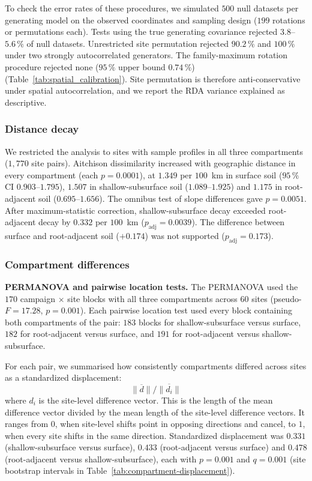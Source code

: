 \documentclass[11pt]{article}
\begin{document}
To check the error rates of these procedures, we simulated $500$ null datasets
per generating model on the observed coordinates and sampling design ($199$
rotations or permutations each). Tests using the true generating covariance
rejected $3.8$--$5.6\,\%$ of null datasets. Unrestricted site permutation
rejected $90.2\,\%$ and $100\,\%$ under two strongly autocorrelated generators.
The family-maximum rotation procedure rejected none ($95\,\%$ upper bound
$0.74\,\%$) (Table~\ref{tab:spatial_calibration}). Site permutation is
therefore anti-conservative under spatial autocorrelation, and we report the
RDA variance explained as descriptive.


\subsubsection{Distance decay}\label{sup:beta_decay}
We restricted the analysis to sites with sample profiles in all three compartments ($1{,}770$ site pairs). Aitchison dissimilarity increased with geographic distance in every compartment (each $p=0.0001$), at $1.349$ per $100$~km in surface soil ($95\,\%$ CI $0.903$--$1.795$), $1.507$ in shallow-subsurface soil ($1.089$--$1.925$) and $1.175$ in root-adjacent soil ($0.695$--$1.656$). The omnibus test of slope differences gave $p=0.0051$. After maximum-statistic correction, shallow-subsurface decay exceeded root-adjacent decay by $0.332$ per $100$~km ($p_{\mathrm{adj}}=0.0039$). The difference between surface and root-adjacent soil ($+0.174$) was not supported ($p_{\mathrm{adj}}=0.173$).


\subsubsection{Compartment differences}\label{sup:beta_compartment}

\textbf{PERMANOVA and pairwise location tests.} The PERMANOVA used the $170$ campaign $\times$ site blocks with all three compartments across $60$ sites (pseudo-$F=17.28$, $p=0.001$). Each pairwise location test used every block containing both compartments of the pair: $183$ blocks for shallow-subsurface versus surface, $182$ for root-adjacent versus surface, and $191$ for root-adjacent versus shallow-subsurface.

For each pair, we summarised how consistently compartments differed across sites as a standardized displacement:
\begin{equation*}
    \lVert\overline{d}\rVert /
\overline{\lVert d_i\rVert}
\end{equation*}
where $d_i$ is the site-level difference vector. This is the length of the mean difference vector divided by the mean length of the site-level difference vectors. It ranges from $0$, when site-level shifts point in opposing directions and cancel, to $1$, when every site shifts in the same direction. Standardized displacement was $0.331$ (shallow-subsurface versus surface), $0.433$ (root-adjacent versus surface) and $0.478$ (root-adjacent versus shallow-subsurface), each with $p=0.001$ and $q=0.001$ (site bootstrap intervals in Table~\ref{tab:compartment-displacement}).

\end{document}
